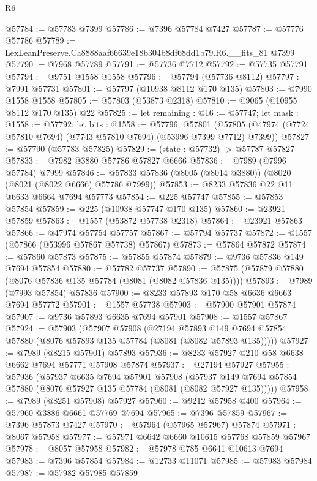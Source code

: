 \begin{lexlean}{R6}
\begin{coremodule}
@57784 := @57783 @7399
@57786 := @7396 @57784 @7427
@57787 := @57776 @57786
@57789 := LexLeanPreserve.Ca8888aaf66639e18b304b8df68dd1b79.R6.__fits_81 @7399
@57790 := @7968 @57789
@57791 := @57736 @7712
@57792 := @57735 @57791
@57794 := @9751 @1558 @1558
@57796 := @57794 (@57736 @8112)
@57797 := @7991 @57731
@57801 := @57797 (@10938 @8112 @170 @135)
@57803 := @7990 @1558 @1558
@57805 := @57803 (@53873 @2318)
@57810 := @9065 (@10955 @8112 @170 @135) @22
@57825 := let remaining : @16 := @57747;
  let mask : @1558 := @57792;
  let bits : @1558 := @57796;
  @57801 (@57805 (@47974 (@7724 @57810 @7694) (@7743 @57810 @7694) (@53996 @7399 @7712) @7399))
@57827 := @57790 (@57783 @57825)
@57829 := (state : @57732) -> @57787 @57827
@57833 := @7982 @3880 @57786 @57827 @6666
@57836 := @7989 (@7996 @57784) @7999
@57846 := @57833 @57836 (@8005 (@8014 @3880)) (@8020 (@8021 (@8022 @6666) @57786 @7999))
@57853 := @8233 @57836 @22 @11 @6633 @6664 @7694 @57773
@57854 := @225 @57747
@57855 := @57853 @57854
@57859 := @225 (@10938 @57747 @170 @135)
@57860 := @23921 @57859
@57863 := @1557 (@53872 @57738 @2318)
@57864 := @23921 @57863
@57866 := @47974 @57754 @57757
@57867 := @57794 @57737
@57872 := @1557 (@57866 (@53996 @57867 @57738) @57867)
@57873 := @57864 @57872
@57874 := @57860 @57873
@57875 := @57855 @57874
@57879 := @9736 @57836 @149 @7694 @57854
@57880 := @57782 @57737
@57890 := @57875 (@57879 @57880 (@8076 @57836 @135 @57784 (@8081 (@8082 @57836 @135))))
@57893 := @7989 (@7993 @57854) @57836
@57900 := @8233 @57893 @170 @58 @6636 @6663 @7694 @57772
@57901 := @1557 @57738
@57903 := @57900 @57901 @57874
@57907 := @9736 @57893 @6635 @7694 @57901
@57908 := @1557 @57867
@57924 := @57903
    (@57907
      @57908
      (@27194
        @57893
        @149
        @7694
        @57854
        @57880
        (@8076 @57893 @135 @57784 (@8081 (@8082 @57893 @135)))))
@57927 := @7989 (@8215 @57901) @57893
@57936 := @8233 @57927 @210 @58 @6638 @6662 @7694 @57771 @57908 @57874
@57937 := @27194 @57927
@57955 := @57936
    (@57937
      @6635
      @7694
      @57901
      @57908
      (@57937 @149 @7694 @57854 @57880 (@8076 @57927 @135 @57784 (@8081 (@8082 @57927 @135)))))
@57958 := @7989 (@8251 @57908) @57927
@57960 := @9212 @57958 @400
@57964 := @57960 @3886 @6661 @57769 @7694
@57965 := @7396 @57859
@57967 := @7396 @57873 @7427
@57970 := @57964 (@57965 @57967) @57874
@57971 := @8067 @57958
@57977 := @57971 @6642 @6660 @10615 @57768 @57859 @57967
@57978 := @8057 @57958
@57982 := @57978 @785 @6641 @10613 @7694
@57983 := @7396 @57854
@57984 := @12733 @11071
@57985 := @57983 @57984
@57987 := @57982 @57985 @57859

\end{coremodule}
\end{lexlean}
